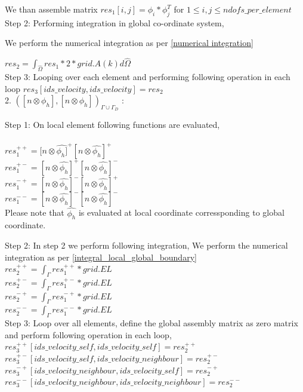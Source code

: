\documentclass[a4paper,12pt]{book}
\begin{document}
We than assemble matrix $res_1[i,j]=\phi_i*\phi_j^T$ for $1 \leq i,j \leq ndofs\_per\_element$\\

Step 2: Performing integration in global co-ordinate system,

We perform the numerical integration as per \ref{numerical integration} 

$res_2 = \int_{\hat{\Omega}} res_1 *2*grid.A(k)  d \hat{\Omega}$\\

Step 3: Looping over each element and performing following operation in each loop $res_3[ids\_velocity,ids\_velocity]=res_2$\\


2. $([n \otimes \phi_h], [n \otimes \phi_h])_{\Gamma \cup \Gamma_D}$ :

Step 1: On local element following functions are evaluated,\\
\\
$res_1^{++} = [n \otimes \hat{\phi_h]}^+ [n \otimes \hat{\phi_h}]^+$\\
$res_1^{+-} = [n \otimes \hat{\phi_h}]^+ [n \otimes \hat{\phi_h}]^-$\\
$res_1^{-+} = [n \otimes \hat{\phi_h}]^- [n \otimes \hat{\phi_h}]^+$\\
$res_1^{--} = [n \otimes \hat{\phi_h}]^- [n \otimes \hat{\phi_h}]^-$\\

Please note that $\hat{\phi_h}$ is evaluated at local coordinate corressponding to global coordinate.

Step 2: In step 2 we perform following integration, 
We perform the numerical integration as per \ref{integral_local_global_boundary}
\\ 
$res_2^{++} = \int_{\Gamma} res_1^{++} * grid.EL$\\
$res_2^{+-} = \int_{\Gamma} res_1^{+-} * grid.EL$\\
$res_2^{-+} = \int_{\Gamma} res_1^{-+} * grid.EL$\\
$res_2^{--} = \int_{\Gamma} res_1^{--} * grid.EL$\\

Step 3: Loop over all elements, define the global assembly matrix as zero matrix and perform following operation in each loop,
\\
$res_3^{++}[ids\_velocity\_self,ids\_velocity\_self] = res_2^{++}$\\
$res_3^{+-}[ids\_velocity\_self,ids\_velocity\_neighbour] = res_2^{+-}$\\
$res_3^{-+}[ids\_velocity\_neighbour,ids\_velocity\_self] = res_2^{-+}$\\
$res_3^{--}[ids\_velocity\_neighbour,ids\_velocity\_neighbour] = res_2^{--}$\\
\end{document}
